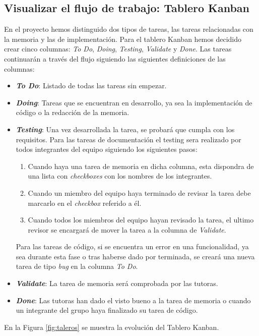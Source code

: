 \subsection{Visualizar el flujo de trabajo: Tablero Kanban}
\label{sec:flujoTrabajo}
En el proyecto hemos distinguido dos tipos de tareas, las tareas relacionadas con la memoria y las de implementación. Para el tablero Kanban hemos decidido crear cinco columnas: \textit{To Do}, \textit{Doing}, \textit{Testing}, \textit{Validate} y \textit{Done}.  Las tareas continuarán a través del flujo siguiendo las siguientes definiciones de las columnas:
\begin{itemize}
    \item \textbf{\textit{To Do}}: Listado de todas las tareas sin empezar.
    \item \textbf{\textit{Doing}}: Tareas que se encuentran en desarrollo, ya sea la implementación de código o la redacción de la memoria.
    \item \textbf{\textit{Testing}}: Una vez desarrollada la tarea, se probará que cumpla con los requisitos.
          Para las tareas de documentación el testing sera realizado por todos integrantes del equipo siguiendo los siguientes pasos:
          \begin{enumerate}
              \item Cuando haya una tarea de memoria en dicha columna, esta dispondra de una lista con \textit{checkboxes} con los nombres de los integrantes.
              \item Cuando un miembro del equipo haya terminado de revisar la tarea debe marcarlo en el \textit{checkbox} referido a él.
              \item Cuando todos los miembros del equipo hayan revisado la tarea, el ultimo revisor se encargará de mover la tarea a la columna de \textit{Validate}.
          \end{enumerate}
          Para las tareas de código, si se encuentra un error en una funcionalidad, ya sea durante esta fase o tras haberse dado por terminada, se creará una nueva tarea de tipo \textit{bug} en la columna \textit{To Do}.
    \item \textbf{\textit{Validate}}: La tarea de memoria será comprobada por las tutoras.
    \item \textbf{\textit{Done}}: Las tutoras han dado el visto bueno a la tarea de memoria o cuando un integrante del grupo haya finalizado su tarea de código.
\end{itemize}
En la Figura \ref{fig:taleros} se muestra la evolución del Tablero Kanban.
